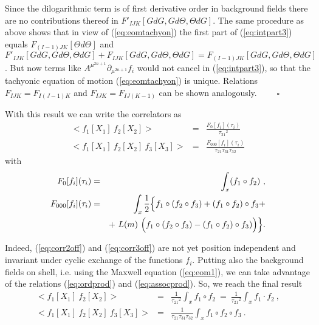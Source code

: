 \documentclass[a4paper,11pt]{article}               \def\new#1\endnew{{\bf #1}}
\begin{document}
Since the dilogarithmic term is of first derivative order in background
fields there are no contributions
thereof in $F'_{IJK}[GdG,Gd\Theta,\Theta dG]$.
The same procedure as above shows that in view of (\ref{eq:eomtachyon})
the first part of (\ref{eq:intpart3}) equals $F_{(I-1)JK}[\Theta d\Theta]$
and $F'_{IJK}[GdG,Gd\Theta,\Theta dG] + F_{IJK}[GdG,Gd\Theta,
\Theta dG]= F_{(I-1)JK}[GdG,Gd\Theta,\Theta dG]$. But now terms like
$A^{\mu^{2n+1}} \partial_{\mu^{2n+1}}f_i$ would not cancel in
(\ref{eq:intpart3}), so that the tachyonic equation of motion
(\ref{eq:eomtachyon}) is unique. Relations $F_{IJK} = F_{I(J-1)K}$
and $F_{IJK} = F_{IJ(K-1)}$ can be shown analogously. $\qquad\square$

With this result we can write the correlators as
\begin{eqnarray}
  \label{eq:corrOnShell}
  <f_1[X_1]~f_2[X_2]> &=& \frac {F_0[f_i](\tau_i)}{\tau_{21}{}^2}
\\
  <f_1[X_1]~f_2[X_2]~f_3[X_3]> &=&
  \frac{F_{000}[f_i](\tau_i)}{\tau_{21}\tau_{31}\tau_{32}}
\nonumber  
\end{eqnarray}
with
\begin{eqnarray}
  \label{eq:corr2off}
  F_0[f_i](\tau_i) &=& \int _x (f_1\circ f_2)~,
\\
  \label{eq:corr3off}
   F_{000}[f_i](\tau_i) &=& \int _x \frac 12 \Bigl\{
          f_1\circ (f_2\circ f_3) + (f_1\circ f_2)\circ f_3 +
\\
      && +~L(m)~\Bigl(f_1\circ (f_2\circ f_3) - (f_1\circ f_2)\circ f_3)\Bigr)
\Bigr\}.
\nonumber
\end{eqnarray}

Indeed, (\ref{eq:corr2off}) and (\ref{eq:corr3off}) are not yet position
independent and invariant under cyclic exchange of the functions $f_i$.
Putting also the background fields on shell, i.e. using 
the Maxwell equation (\ref{eq:eom1}), we can take advantage of
the relations (\ref{eq:ordprod}) and (\ref{eq:assocprod}). So, we reach 
the final result
\begin{eqnarray}
  \label{eq:corr2on}
  <f_1[X_1]~f_2[X_2]> &=& \frac {1}{\tau_{21}{}^2} \int _x f_1\circ f_2 
           ~=~ \frac {1}{\tau_{21}{}^2} \int _x f_1\cdot f_2~,
\\
  \label{eq:corr3on}
  <f_1[X_1]~f_2[X_2]~f_3[X_3]> &=&  \frac {1}{\tau_{21}\tau_{31}\tau_{32}}
                     \int _x f_1\circ f_2\circ f_3~.
\nonumber
\end{eqnarray}
\end{document}
